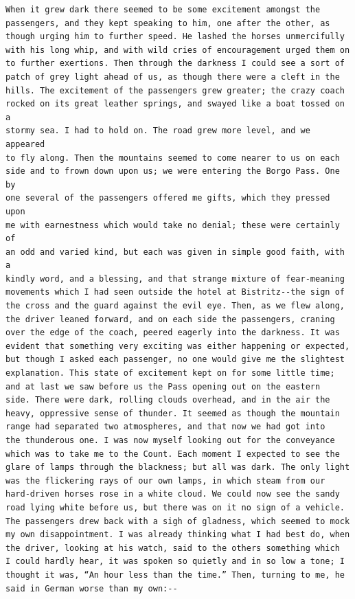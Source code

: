 \documentclass{article}
\begin{document}
\begin{verbatim}
When it grew dark there seemed to be some excitement amongst the
passengers, and they kept speaking to him, one after the other, as
though urging him to further speed. He lashed the horses unmercifully
with his long whip, and with wild cries of encouragement urged them on
to further exertions. Then through the darkness I could see a sort of
patch of grey light ahead of us, as though there were a cleft in the
hills. The excitement of the passengers grew greater; the crazy coach
rocked on its great leather springs, and swayed like a boat tossed on a
stormy sea. I had to hold on. The road grew more level, and we appeared
to fly along. Then the mountains seemed to come nearer to us on each
side and to frown down upon us; we were entering the Borgo Pass. One by
one several of the passengers offered me gifts, which they pressed upon
me with earnestness which would take no denial; these were certainly of
an odd and varied kind, but each was given in simple good faith, with a
kindly word, and a blessing, and that strange mixture of fear-meaning
movements which I had seen outside the hotel at Bistritz--the sign of
the cross and the guard against the evil eye. Then, as we flew along,
the driver leaned forward, and on each side the passengers, craning
over the edge of the coach, peered eagerly into the darkness. It was
evident that something very exciting was either happening or expected,
but though I asked each passenger, no one would give me the slightest
explanation. This state of excitement kept on for some little time;
and at last we saw before us the Pass opening out on the eastern
side. There were dark, rolling clouds overhead, and in the air the
heavy, oppressive sense of thunder. It seemed as though the mountain
range had separated two atmospheres, and that now we had got into
the thunderous one. I was now myself looking out for the conveyance
which was to take me to the Count. Each moment I expected to see the
glare of lamps through the blackness; but all was dark. The only light
was the flickering rays of our own lamps, in which steam from our
hard-driven horses rose in a white cloud. We could now see the sandy
road lying white before us, but there was on it no sign of a vehicle.
The passengers drew back with a sigh of gladness, which seemed to mock
my own disappointment. I was already thinking what I had best do, when
the driver, looking at his watch, said to the others something which
I could hardly hear, it was spoken so quietly and in so low a tone; I
thought it was, “An hour less than the time.” Then, turning to me, he
said in German worse than my own:--


\end{verbatim}
\end{document}
